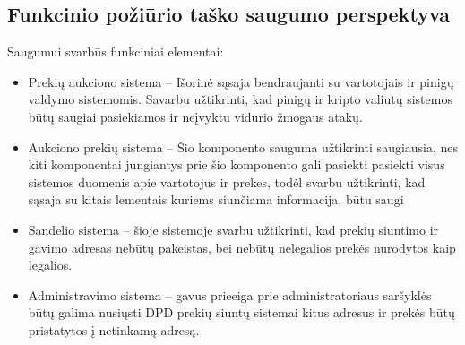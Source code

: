 \documentclass{VUMIFPSmagistrinis}
\begin{document}
			\subsection{Funkcinio požiūrio taško saugumo perspektyva}
				Saugumui svarbūs funkciniai elementai:
				\begin{itemize}
					\item{Prekių aukciono sistema -- Išorinė sąsaja bendraujanti su vartotojais ir pinigų valdymo sistemomis. Savarbu užtikrinti, kad pinigų ir kripto valiutų sistemos būtų saugiai pasiekiamos ir neįvyktu vidurio žmogaus atakų.}
					\item{Aukciono prekių sistema -- Šio komponento sauguma užtikrinti saugiausia, nes kiti komponentai jungiantys prie šio komponento gali pasiekti pasiekti visus sistemos duomenis apie vartotojus ir prekes, todėl svarbu užtikrinti, kad sąsaja su kitais lementais kuriems siunčiama informacija, būtu saugi}
					\item{Sandelio sistema -- šioje sistemoje svarbu užtikrinti, kad prekių siuntimo ir gavimo adresas nebūtų pakeistas, bei nebūtų nelegalios prekės nurodytos kaip legalios.}
					\item{Administravimo sistema -- gavus prieeiga prie administratoriaus saršyklės būtų galima nusiųsti DPD prekių siuntų sistemai kitus adresus ir prekės būtų pristatytos į netinkamą adresą.}
				\end{itemize}
\end{document}
